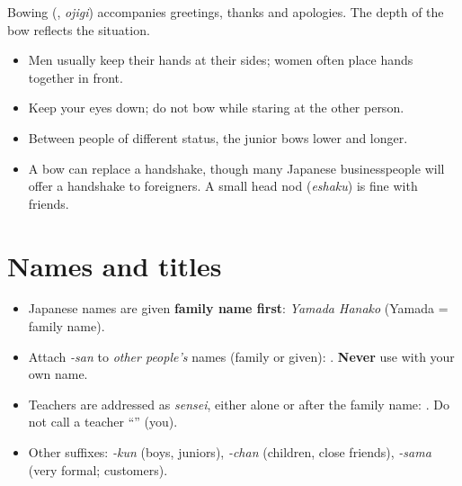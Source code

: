 Bowing (, \emph{ojigi}) accompanies greetings, thanks and apologies. The depth
of the bow reflects the situation.

\begin{center}
\end{center}

\begin{itemize}
  \item Men usually keep their hands at their sides; women often place hands together
        in front.
  \item Keep your eyes down; do not bow while staring at the other person.
  \item Between people of different status, the junior bows lower and longer.
  \item A bow can replace a handshake, though many Japanese businesspeople will offer
        a handshake to foreigners. A small head nod (\emph{eshaku}) is fine with friends.
\end{itemize}

\section{Names and titles}

\begin{important}
\begin{itemize}
  \item Japanese names are given \textbf{family name first}: 
        \emph{Yamada Hanako} (Yamada = family name).
  \item Attach  \emph{-san} to \emph{other people's} names (family or given):
        . \textbf{Never} use  with your own name.
  \item Teachers are addressed as  \emph{sensei}, either alone or after the
        family name: . Do not call a teacher ``'' (you).
  \item Other suffixes:  \emph{-kun} (boys, juniors),  \emph{-chan}
        (children, close friends),  \emph{-sama} (very formal; customers).
\end{itemize}
\end{important}


